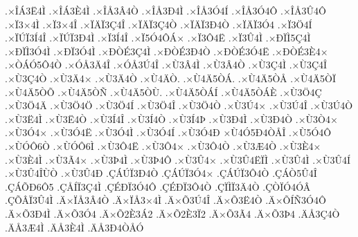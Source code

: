 {.^^d7^^ce^^c13^^cb4^^cc
.^^d7^^ce^^c13^^c84^^cc
.^^d7^^ce^^c53^^c24^^d2
.^^d7^^ce^^c53^^d04^^cc
.^^d7^^ce^^c53^^d34^^cd
.^^d7^^ce^^c53^^d34^^d4
.^^d7^^ce^^c53^^db4^^d4
.^^d7^^cf3^^d74^^cc
.^^d7^^cf3^^d74^^ce
.^^d7^^cf^^c4^^cf3^^c74^^ce
.^^d7^^cf^^c4^^cf3^^c74^^d2
.^^d7^^cf^^c4^^cf3^^d04^^d2
.^^d7^^cf^^c4^^cf3^^d34
.^^d7^^cf3^^d64^^cd
.^^d7^^cf^^da^^cf3^^cd4^^ce
.^^d7^^cf^^da^^cf3^^d04^^cc
.^^d7^^cf3^^cd4^^ce
.^^d7^^cf5^^d34^^d4^^c1^^d7
.^^d7^^cf3^^d44^^cb
.^^d7^^cf3^^db4^^cc
.^^d7^^d0^^cf^^cc5^^c74^^cc
.^^d7^^d0^^cf^^cc3^^d34^^cc
.^^d7^^d0^^cf3^^d34^^cc
.^^d7^^d0^^d2^^c93^^c74^^cc
.^^d7^^d0^^d2^^c93^^d04^^d2
.^^d7^^d0^^d2^^c93^^d34^^cb
.^^d7^^d0^^d2^^c93^^c84^^d7
.^^d7^^d2^^c1^^d35^^d44^^d2
.^^d7^^d3^^c53^^c44^^ce
.^^d7^^d3^^c53^^da4^^ce
.^^d7^^d93^^c24^^cc
.^^d7^^d93^^c24^^d2
.^^d7^^d93^^c74^^cc
.^^d7^^d93^^c74^^ce
.^^d7^^d93^^c74^^d2
.^^d7^^d93^^c44^^d7
.^^d7^^d93^^c44^^d2
.^^d7^^d94^^c4^^d2.
.^^d7^^d94^^c45^^d2^^c1.
.^^d7^^d94^^c45^^d2^^c5
.^^d7^^d94^^c45^^d2^^cf
.^^d7^^d94^^c45^^d2^^d5
.^^d7^^d94^^c45^^d2^^d1
.^^d7^^d94^^c45^^d2^^d9.
.^^d7^^d94^^c45^^d2^^c1^^cd
.^^d7^^d94^^c45^^d2^^c1^^c8
.^^d7^^d93^^d64^^c7
.^^d7^^d93^^d64^^c4
.^^d7^^d93^^d64^^d6
.^^d7^^d93^^d64^^cd
.^^d7^^d93^^d64^^ce
.^^d7^^d93^^d64^^d2
.^^d7^^d93^^da4^^d7
.^^d7^^d93^^da4^^ce
.^^d7^^d93^^da4^^d2
.^^d7^^d93^^cb4^^cc
.^^d7^^d93^^cb4^^d2
.^^d7^^d93^^cd4^^ce
.^^d7^^d93^^cd4^^d2
.^^d7^^d93^^cd4^^de
.^^d7^^d93^^d04^^cc
.^^d7^^d93^^d04^^d2
.^^d7^^d93^^d24^^d7
.^^d7^^d93^^d34^^d7
.^^d7^^d93^^d34^^cb
.^^d7^^d93^^d34^^cc
.^^d7^^d93^^d34^^cd
.^^d7^^d93^^d34^^d0
^^d7^^d94^^d35^^d04^^d2^^c5^^ce
.^^d7^^d95^^d34^^d4
.^^d7^^d9^^d3^^d46^^d2
.^^d7^^d9^^d3^^d46^^cc
.^^d7^^d93^^d44^^cb
.^^d7^^d93^^d44^^d7
.^^d7^^d93^^d44^^d2
.^^d7^^d93^^c64^^d2
.^^d7^^d93^^c84^^d7
.^^d7^^d93^^c84^^cc
.^^d7^^d93^^c34^^d7
.^^d7^^d93^^de4^^cc
.^^d7^^d93^^de4^^d4
.^^d7^^d93^^db4^^d7
.^^d7^^d93^^db4^^cb^^cf^^cc
.^^d7^^d93^^db4^^cc
.^^d7^^d93^^db4^^cd
.^^d7^^d93^^db4^^ce^^d9^^d2
.^^d7^^d93^^db4^^d0
.^^c7^^c1^^da^^cf3^^d04^^d2
.^^c7^^c1^^da^^cf3^^d34^^d7
.^^c7^^c1^^da^^cf3^^d44^^d2
.^^c7^^c1^^d25^^db4^^ce
.^^c7^^c1^^d5^^d06^^d45
.^^c7^^c5^^cd^^cf3^^c74^^cc
.^^c7^^c9^^d0^^cf3^^d34^^d4
.^^c7^^c9^^d0^^cf3^^d44^^d2
.^^c7^^cf^^cc^^cf3^^c44^^d2
.^^c7^^d2^^cf^^d34^^d3^^c2
.^^c7^^d5^^c2^^cf3^^db4^^cc
.^^c4^^d7^^cf^^c53^^c24^^d2
.^^c4^^d7^^cf^^c53^^d74^^cc
.^^c4^^d7^^d53^^da4^^ce
.^^c4^^d7^^d53^^cb4^^d2
.^^c4^^d7^^d5^^cd^^d13^^d34^^d4
.^^c4^^d7^^d53^^d04^^cc
.^^c4^^d7^^d53^^d34
.^^c4^^d7^^d52^^c83^^c12
.^^c4^^d7^^d52^^c83^^cf2
.^^c4^^d7^^d53^^c34
.^^c4^^d7^^d53^^de4
.^^c4^^c53^^c74^^d2
.^^c4^^c53^^c64^^cc
.^^c4^^c53^^c84^^cc
.^^c4^^c53^^d04^^d2^^c5^^d3
}
